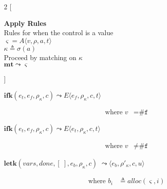 \documentclass[12pt,draft]{article}
\newcommand{\falsesyn}{\texttt{\#f}}
\begin{document}
\newpage


\begin{multicols*}{2}
[
\begin{center}
\textbf{Apply Rules} \\
Rules for when the control is a value \\
$\varsigma = A\langle v , \rho , a , t \rangle$ \\
$\kappa \triangleq \sigma(a)$ \\
Proceed by matching on $\kappa$ \\
\vspace{5mm}
$\textbf{mt} \leadsto \varsigma$
\end{center}
\vspace{-5mm}
]
\begin{center}
  $\textbf{ifk}(e_t, e_f, \rho_\kappa, c)
  \leadsto E\langle e_f , \rho_\kappa , c , t \rangle$
\end{center}
\vspace{-7mm}
\begin{align*}
\text{where } v &= \falsesyn
\end{align*}
\begin{center}
  $\textbf{ifk}(e_t, e_f, \rho_\kappa, c)
  \leadsto E\langle e_t , \rho_\kappa , c , t \rangle$
\end{center}
\vspace{-7mm}
\begin{align*}
\text{where } v &\not= \falsesyn
\end{align*}
\begin{center}
  $\textbf{letk}(vars, done, [\;], e_b, \rho_\kappa , c)$
  $\leadsto \langle e_b , \rho'_\kappa , c , u \rangle $
\end{center}
\vspace{-7mm}
\begin{align*}
\text{where } b_i &\triangleq alloc(\varsigma, i) \\

\end{align*}
\end{multicols*}
\end{document}
